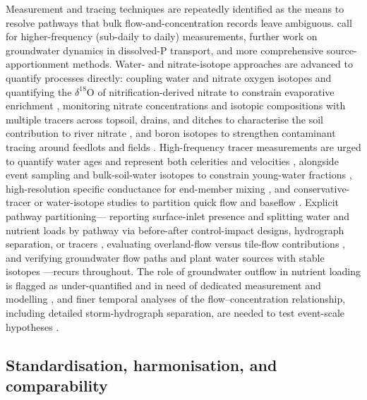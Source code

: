 Measurement and tracing techniques are repeatedly identified as the means
to resolve pathways that bulk flow-and-concentration records leave
ambiguous. \textcite{Williams2022} call for higher-frequency (sub-daily to
daily) measurements, further work on groundwater dynamics in dissolved-P
transport, and more comprehensive source-apportionment methods.
Water- and nitrate-isotope approaches are advanced to quantify processes
directly: coupling water and nitrate oxygen isotopes and quantifying the
$\delta^{18}$O of nitrification-derived nitrate to constrain evaporative
enrichment \parencite{Hu2024}, monitoring nitrate concentrations and
isotopic compositions with multiple tracers across topsoil, drains, and
ditches to characterise the soil contribution to river nitrate
\parencite{Briand2017}, and boron isotopes to strengthen contaminant
tracing around feedlots and fields \parencite{Komor1997}. High-frequency
tracer measurements are urged to quantify water ages and represent both
celerities and velocities \parencite{Williams2021}, alongside event
sampling and bulk-soil-water isotopes to constrain young-water fractions
\parencite{DimitrovaPetrova2020}, high-resolution specific conductance for
end-member mixing \parencite{Kronholm2015,Schilling2019}, and
conservative-tracer or water-isotope studies to partition quick flow and
baseflow \parencite{Frederiksen2023}. Explicit pathway partitioning---
reporting surface-inlet presence and splitting water and nutrient loads by
pathway via before-after control-impact designs, hydrograph separation, or
tracers \parencite{Flores2021}, evaluating overland-flow versus tile-flow
contributions \parencite{Kokulan2019}, and verifying groundwater flow paths
and plant water sources with stable isotopes
\parencite{Islam2022,YliHalla2022}---recurs throughout. The role of
groundwater outflow in nutrient loading is flagged as under-quantified and
in need of dedicated measurement and modelling
\parencite{Turunen2013,Jokinen2024,Barkle2021}, and finer temporal analyses
of the flow--concentration relationship, including detailed storm-hydrograph
separation, are needed to test event-scale hypotheses
\parencite{Lagzdins2015,Danalatos2022,Kladivko2004}.

\subsection{Standardisation, harmonisation, and comparability}

